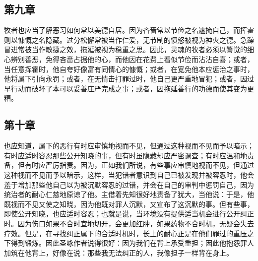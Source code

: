 
\subsection{第九章}

\par

牧者也应当了解恶习如何常以美德自居。因为吝啬常以节俭之名遮掩自己，而挥霍则以慷慨之名隐藏。过分松懈常被当作仁爱，无节制的愤怒被视为神火之德。急躁冒进常被当作敏捷之效，拖延被视为稳重之思。因此，灵魂的牧者必须以警觉的细心辨别善恶，免得吝啬占据他的心，而他因在花费上看似节俭而沾沾自喜；或者，当任意挥霍时，他自夸好像富有同情心的慷慨；或者，在宽免他本应惩治之事时，他将属下引向永罚；或者，在无情击打罪过时，他自己更严重地冒犯；或者，因过早行动而破坏了本可以妥善庄严完成之事；或者，因拖延善行的功德而使其变为更糟。\par


\subsection{第十章}

\par

也应知道，属下的恶行有时应审慎地视而不见，但通过这种视而不见而予以暗示；有时应适时容忍那些公开知晓的事，但有时虽隐藏却应严密调查；有时应温和地责备，但有时应严厉指责。因为，正如我们所说，有些事应审慎地视而不见，但通过这种视而不见而予以暗示，这样，当犯错者意识到自己已被发现并被容忍时，他会羞于增加那些他自己以为被沉默容忍的过错，并会在自己的审判中惩罚自己，因为统治者的耐心仁慈地原谅了他。主借着先知很好地责备了犹大，当他说：于是，他既视而不见又使之知晓，因为他既对罪人沉默，又宣布了这沉默的事。但有些事，即使公开知晓，也应适时容忍；也就是说，当环境没有提供适当机会进行公开纠正时。因为伤口如果不合时宜地切开，会更加红肿，如果药物不合时机，无疑会失去疗效。但是，在寻找纠正属下的合适时机时，长上的耐心正是在他们罪过的重压之下得到锻炼。因此圣咏作者说得很好：因为我们在背上承受重担；因此他抱怨罪人加筑在他背上，好像在说：那些我无法纠正的人，我像担子一样背在身上。\par

